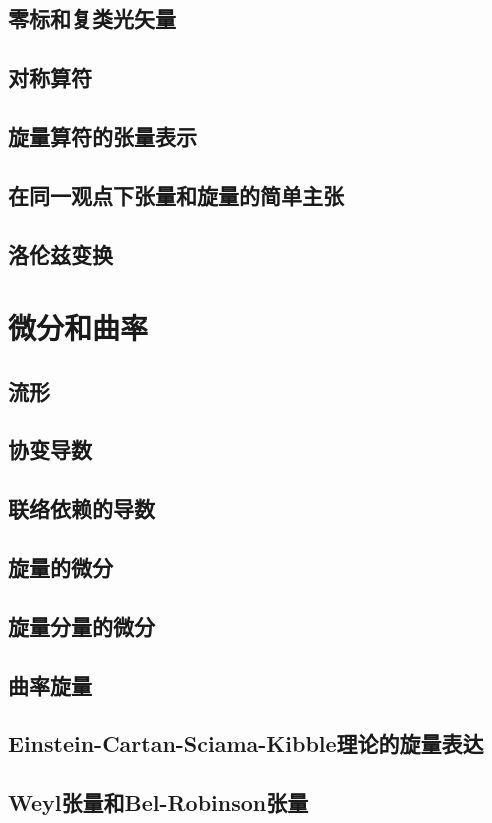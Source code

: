 \documentclass[utf8]{ctexbook}
\numberwithin{equation}{section}
\begin{document}
\section{零标和复类光矢量}
\section{对称算符}
\section{旋量算符的张量表示}
\section{在同一观点下张量和旋量的简单主张}
\section{洛伦兹变换}
\chapter{微分和曲率}
\section{流形}
\section{协变导数}
\section{联络依赖的导数}
\section{旋量的微分}
\section{旋量分量的微分}
\section{曲率旋量}
\section{Einstein-Cartan-Sciama-Kibble理论的旋量表达}
\section{Weyl张量和Bel-Robinson张量}
\end{document}
